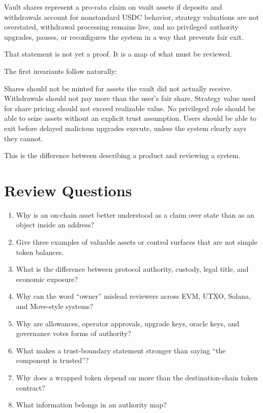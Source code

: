 \begin{codeblock}
Vault shares represent a pro-rata claim on vault assets if deposits and
withdrawals account for nonstandard USDC behavior, strategy valuations
are not overstated, withdrawal processing remains live, and no privileged
authority upgrades, pauses, or reconfigures the system in a way that
prevents fair exit.
\end{codeblock}

That statement is not yet a proof. It is a map of what must be reviewed.

The first invariants follow naturally:

\begin{codeblock}
Shares should not be minted for assets the vault did not actually receive.
Withdrawals should not pay more than the user's fair share.
Strategy value used for share pricing should not exceed realizable value.
No privileged role should be able to seize assets without an explicit trust assumption.
Users should be able to exit before delayed malicious upgrades execute, unless the system clearly says they cannot.
\end{codeblock}

This is the difference between describing a product and reviewing a system.

\section*{Review Questions}

\begin{enumerate}
\item Why is an on-chain asset better understood as a claim over state than as an object inside an address?
\item Give three examples of valuable assets or control surfaces that are not simple token balances.
\item What is the difference between protocol authority, custody, legal title, and economic exposure?
\item Why can the word ``owner'' mislead reviewers across EVM, UTXO, Solana, and Move-style systems?
\item Why are allowances, operator approvals, upgrade keys, oracle keys, and governance votes forms of authority?
\item What makes a trust-boundary statement stronger than saying ``the component is trusted''?
\item Why does a wrapped token depend on more than the destination-chain token contract?
\item What information belongs in an authority map?
\end{enumerate}

